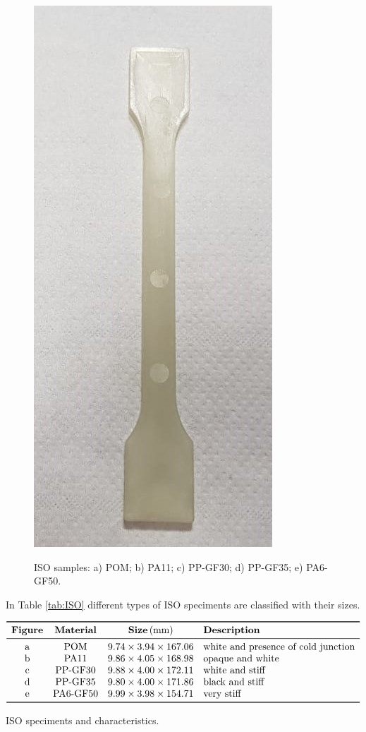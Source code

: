 \documentclass[a4paper, 11pt]{article}
\begin{document}
\begin{figure}[htp]
{\includegraphics[scale=0.2]{PA6GF}}
\captionsetup{justification=centering}
\caption{ISO samples: a) POM; b) PA11; c) PP-GF30; d) PP-GF35; e) PA6-GF50. }
\label{fig:ISO}
\end{figure}
\newpage
In Table \ref{tab:ISO} different types of ISO speciments are classified with their sizes.

\begin{table}[htp]
\centering
$
\begin{array}{cccl}
\toprule
\textbf{Figure} & \textbf{Material} & \textbf{Size}\,(\text{mm}) & \textbf{Description} \\
\midrule
\text{a} & \text{POM} & 9.74\times 3.94\times 167.06 & \text{white and presence of cold junction}\\
\text{b} & \text{PA11} & 9.86\times 4.05\times 168.98 & \text{opaque and white}\\
\text{c} & \text{PP-GF30} & 9.88\times 4.00\times 172.11 & \text{white and stiff}\\
\text{d} & \text{PP-GF35} & 9.80\times 4.00\times 171.86 & \text{black and stiff}\\
\text{e} & \text{PA6-GF50} & 9.99\times 3.98\times 154.71 & \text{very stiff}\\
\bottomrule
\end{array}
$
\caption{ISO speciments and characteristics.}
\label{tab:ISO}
\end{table}
\end{document}
